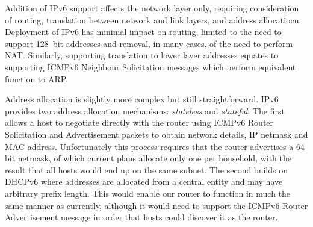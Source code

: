 Addition of IPv6 support affects the network layer only, requiring consideration
of routing, translation between network and link layers, and address
allocatiocn.  Deployment of IPv6 has minimal impact on routing, limited to the
need to support 128~bit addresses and removal, in many cases, of the need to
perform NAT.
Similarly, supporting translation to lower layer addresses equates to supporting
ICMPv6 Neighbour Solicitation messages which perform equivalent function to ARP.


Address allocation is slightly more complex but still straightforward.  IPv6
provides two address allocation mechanisms: \emph{stateless} and
\emph{stateful}.  The first allows a host to negotiate directly with the router
using ICMPv6 Router Solicitation and Advertisement packets to obtain network
details, IP netmask and MAC address.  Unfortunately this process requires that
the router advertises a 64 bit netmask, of which current plans allocate only one
per household, with the result that all hosts would end up on the same subnet.
The second builds on DHCPv6 where addresses are allocated from a central entity
and may have arbitrary prefix length.  This would enable our router to function
in much the same manner as currently, although it would need to support the
ICMPv6 Router Advertisement message in order that hosts could discover it as the
router. 

